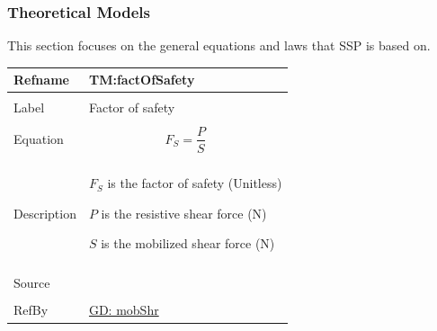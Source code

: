 \documentclass[12pt]{article}
\begin{document}
\subsubsection{Theoretical Models}
\label{Sec:TMs}
This section focuses on the general equations and laws that SSP is based on.

\vspace{\baselineskip}
\noindent
\begin{minipage}{\textwidth}
\begin{tabular}{>{\raggedright}p{}>{\raggedright\arraybackslash}p{}}
\toprule \textbf{Refname} & \textbf{TM:factOfSafety}
\label{TM:factOfSafety}
\\ \midrule \\
Label & Factor of safety
        
\\ \midrule \\
Equation & \begin{displaymath}
           {F_{S}}=\frac{P}{S}
           \end{displaymath}
\\ \midrule \\
Description & \begin{symbDescription}
              \item{${F_{S}}$ is the factor of safety (Unitless)}
              \item{$P$ is the resistive shear force (N)}
              \item{$S$ is the mobilized shear force (N)}
              \end{symbDescription}
\\ \midrule \\
Source & \cite{fredlund1977}
         
\\ \midrule \\
RefBy & \hyperref[GD:mobShr]{GD: mobShr}
        
\\ \bottomrule
\end{tabular}
\end{minipage}
\vspace{\baselineskip}
\noindent
\end{document}
